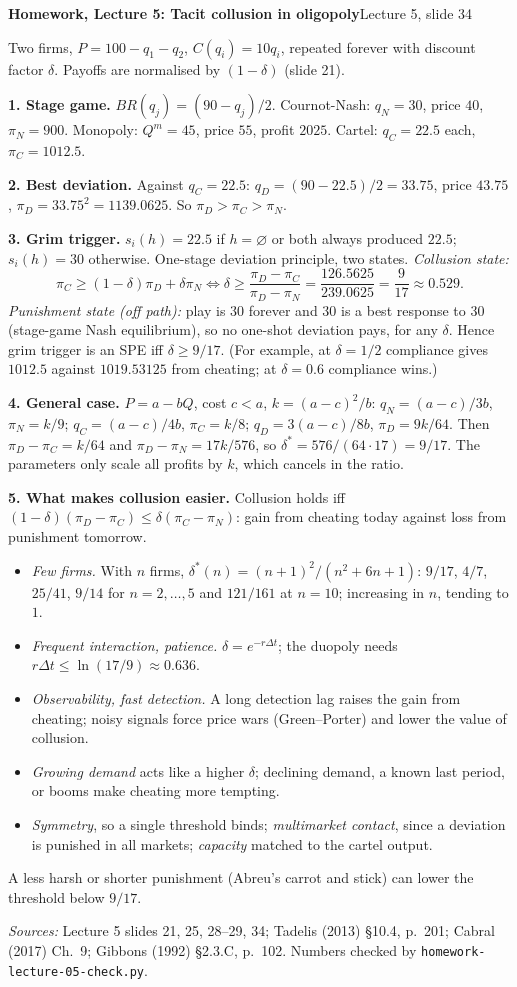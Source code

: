 \documentclass[10pt,a4paper]{article}
\begin{document}
{\large\textbf{Homework, Lecture 5: Tacit collusion in oligopoly}}\hfill Lecture 5, slide 34

Two firms, $P = 100 - q_1 - q_2$, $C(q_i) = 10q_i$, repeated forever with discount factor $\delta$.
Payoffs are normalised by $(1-\delta)$ (slide 21).

\textbf{1. Stage game.} $BR(q_j) = (90 - q_j)/2$. Cournot-Nash: $q_N = 30$, price $40$,
$\pi_N = 900$. Monopoly: $Q^m = 45$, price $55$, profit $2025$. Cartel: $q_C = 22.5$ each,
$\pi_C = 1012.5$.

\textbf{2. Best deviation.} Against $q_C = 22.5$: $q_D = (90 - 22.5)/2 = 33.75$, price $43.75$,
$\pi_D = 33.75^2 = 1139.0625$. So $\pi_D > \pi_C > \pi_N$.

\textbf{3. Grim trigger.} $s_i(h) = 22.5$ if $h = \varnothing$ or both always produced $22.5$; $s_i(h) = 30$
otherwise. One-stage deviation principle, two states.
\emph{Collusion state:}
\[
\pi_C \ge (1-\delta)\pi_D + \delta\pi_N \iff
\delta \ge \frac{\pi_D - \pi_C}{\pi_D - \pi_N} = \frac{126.5625}{239.0625} = \frac{9}{17} \approx 0.529 .
\]
\emph{Punishment state (off path):} play is $30$ forever and $30$ is a best response to $30$ (stage-game
Nash equilibrium), so no one-shot deviation pays, for any $\delta$. Hence grim trigger is an SPE iff
$\delta \ge 9/17$. (For example, at $\delta = 1/2$ compliance gives $1012.5$ against $1019.53125$ from
cheating; at $\delta = 0.6$ compliance wins.)

\textbf{4. General case.} $P = a - bQ$, cost $c < a$, $k = (a-c)^2/b$: $q_N = (a-c)/3b$, $\pi_N = k/9$;
$q_C = (a-c)/4b$, $\pi_C = k/8$; $q_D = 3(a-c)/8b$, $\pi_D = 9k/64$. Then
$\pi_D - \pi_C = k/64$ and $\pi_D - \pi_N = 17k/576$, so $\delta^* = 576/(64\cdot17) = 9/17$.
The parameters only scale all profits by $k$, which cancels in the ratio.

\textbf{5. What makes collusion easier.} Collusion holds iff
$(1-\delta)(\pi_D - \pi_C) \le \delta(\pi_C - \pi_N)$: gain from cheating today against loss from
punishment tomorrow.
\begin{itemize}
\item \emph{Few firms.} With $n$ firms, $\delta^*(n) = (n+1)^2/(n^2 + 6n + 1)$: $9/17$, $4/7$, $25/41$,
$9/14$ for $n = 2, \dots, 5$ and $121/161$ at $n = 10$; increasing in $n$, tending to $1$.
\item \emph{Frequent interaction, patience.} $\delta = e^{-r\Delta t}$; the duopoly needs
$r\Delta t \le \ln(17/9) \approx 0.636$.
\item \emph{Observability, fast detection.} A long detection lag raises the gain from cheating; noisy
signals force price wars (Green--Porter) and lower the value of collusion.
\item \emph{Growing demand} acts like a higher $\delta$; declining demand, a known last period, or booms
make cheating more tempting.
\item \emph{Symmetry}, so a single threshold binds; \emph{multimarket contact}, since a deviation is punished
in all markets; \emph{capacity} matched to the cartel output.
\end{itemize}
A less harsh or shorter punishment (Abreu's carrot and stick) can lower the threshold below $9/17$.

\textit{Sources:} Lecture 5 slides 21, 25, 28--29, 34; Tadelis (2013) \S10.4, p.~201; Cabral (2017) Ch.~9;
Gibbons (1992) \S2.3.C, p.~102. Numbers checked by \texttt{homework-lecture-05-check.py}.
\end{document}
